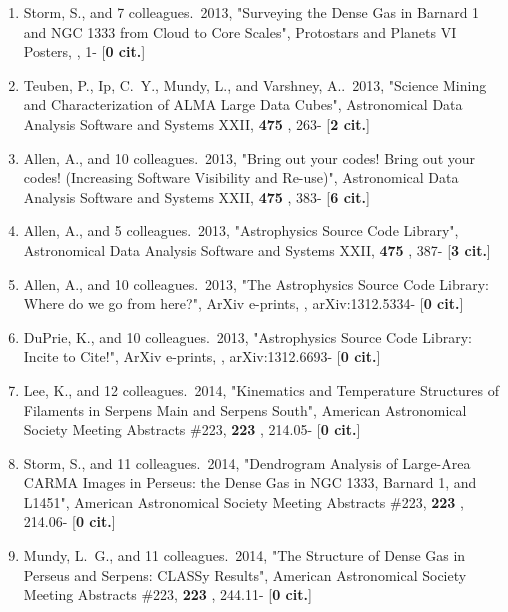 \documentclass[11pt,letterpaper]{article}
\begin{document}
\begin{enumerate}[resume,label=\textbf{\arabic*}.]
\item  
Storm, S., and 7 colleagues.\  2013,  "Surveying the Dense Gas in Barnard 1 
and NGC 1333 from Cloud to Core Scales", Protostars and Planets VI Posters,  
, 1- [{\bf 0 cit.}] 

\item  
Teuben, P., Ip, C.~Y., Mundy, L., and Varshney, A..\  2013,  "Science 
Mining and Characterization of ALMA Large Data Cubes", Astronomical Data 
Analysis Software and Systems XXII,  {\bf 475} , 263- [{\bf 2 cit.}] 

\item  
Allen, A., and 10 colleagues.\  2013,  "Bring out your codes! Bring out 
your codes! (Increasing Software Visibility and Re-use)", Astronomical Data 
Analysis Software and Systems XXII,  {\bf 475} , 383- [{\bf 6 cit.}] 

\item  
Allen, A., and 5 colleagues.\  2013,  "Astrophysics Source Code Library", 
Astronomical Data Analysis Software and Systems XXII,  {\bf 475} , 387- 
[{\bf 3 cit.}] 

\item  
Allen, A., and 10 colleagues.\  2013,  "The Astrophysics Source Code 
Library: Where do we go from here?", ArXiv e-prints,  , arXiv:1312.5334- 
[{\bf 0 cit.}] 

\item  
DuPrie, K., and 10 colleagues.\  2013,  "Astrophysics Source Code Library: 
Incite to Cite!", ArXiv e-prints,  , arXiv:1312.6693- [{\bf 0 cit.}] 

\item  
Lee, K., and 12 colleagues.\  2014,  "Kinematics and Temperature Structures 
of Filaments in Serpens Main and Serpens South", American Astronomical 
Society Meeting Abstracts \#223,  {\bf 223} , 214.05- [{\bf 0 cit.}] 

\item  
Storm, S., and 11 colleagues.\  2014,  "Dendrogram Analysis of Large-Area 
CARMA Images in Perseus: the Dense Gas in NGC 1333, Barnard 1, and L1451", 
American Astronomical Society Meeting Abstracts \#223,  {\bf 223} , 214.06- 
[{\bf 0 cit.}] 

\item  
Mundy, L.~G., and 11 colleagues.\  2014,  "The Structure of Dense Gas in 
Perseus and Serpens: CLASSy Results", American Astronomical Society Meeting 
Abstracts \#223,  {\bf 223} , 244.11- [{\bf 0 cit.}] 


\end{enumerate}
\end{document}
